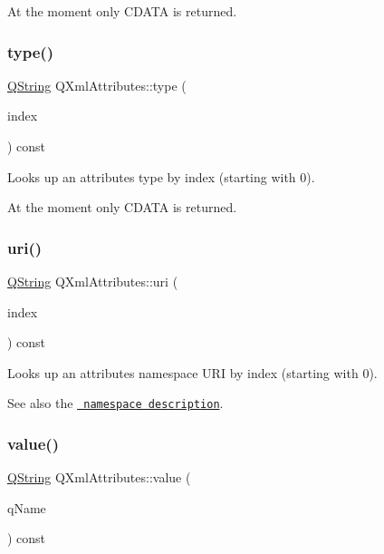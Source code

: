 At the moment only \textquotesingle{}C\+D\+A\+TA\textquotesingle{} is returned. \mbox{\label{class_q_xml_attributes_a922b2f1cbb3d4d39843ca23019eb4b72}} 
\subsubsection{\texorpdfstring{type()}{type()}\hspace{0.1cm}{\footnotesize\ttfamily [3/3]}}
{\footnotesize\ttfamily \mbox{\hyperlink{class_q_string}{Q\+String}} Q\+Xml\+Attributes\+::type (\begin{DoxyParamCaption}\item[{int}]{index }\end{DoxyParamCaption}) const}

Looks up an attribute\textquotesingle{}s type by index (starting with 0).

At the moment only \textquotesingle{}C\+D\+A\+TA\textquotesingle{} is returned. \mbox{\label{class_q_xml_attributes_aff9c3f007752e367a6ccc83fb3537496}} 
\subsubsection{\texorpdfstring{uri()}{uri()}}
{\footnotesize\ttfamily \mbox{\hyperlink{class_q_string}{Q\+String}} Q\+Xml\+Attributes\+::uri (\begin{DoxyParamCaption}\item[{int}]{index }\end{DoxyParamCaption}) const}

Looks up an attribute\textquotesingle{}s namespace U\+RI by index (starting with 0).

See also the \href{xml-sax.html\#namespaces}{\texttt{ namespace description}}. \mbox{\label{class_q_xml_attributes_aeec12bba8c7db83033d1c62d9263d9b8}} 
\subsubsection{\texorpdfstring{value()}{value()}\hspace{0.1cm}{\footnotesize\ttfamily [1/3]}}
{\footnotesize\ttfamily \mbox{\hyperlink{class_q_string}{Q\+String}} Q\+Xml\+Attributes\+::value (\begin{DoxyParamCaption}\item[{const \mbox{\hyperlink{class_q_string}{Q\+String}} \&}]{q\+Name }\end{DoxyParamCaption}) const}

